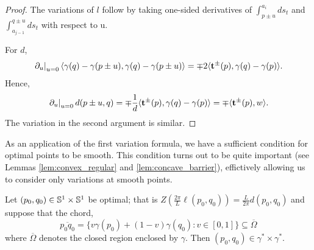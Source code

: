 \documentclass[12pt]{amsart}
\begin{document}
\begin{proof}
The variations of \(l\) follow by taking one-sided derivatives of \(\int_{p\pm u}^{a_i} ds_t\) and \(\int_{a_{j-1}}^{q \pm u} ds_t\) with respect to u.

For \(d\),
\[
\left.\partial_u\right|_{u=0} \langle{\gamma(q) - \gamma(p \pm u)},{\gamma(q) - \gamma(p \pm u)}\rangle = \mp 2 \langle{\operatorname{\mathbf{t}}^{\pm}(p)},{\gamma(q) - \gamma(p)}\rangle.
\]
Hence,
\[
\left.\partial_u\right|_{u=0} d (p \pm u, q) =  \mp \frac{1}{d} \langle{\operatorname{\mathbf{t}}^{\pm}(p)},{\gamma(q) - \gamma(p)}\rangle = \mp \langle{\operatorname{\mathbf{t}}^{\pm}(p)},{w}\rangle.
\]
The variation in the second argument is similar.
\end{proof}

As an application of the first variation formula, we have a sufficient condition for optimal points to be smooth. This condition turns out to be quite important (see Lemmas \ref{lem:convex_regular} and \ref{lem:concave_barrier}), effictively allowing us to consider only variations at smooth points.

\begin{lemma}
\label{lem:optimum_are_regular}

Let \((p_0,q_0) \in \mathbb{S}^1 \times \mathbb{S}^1\) be optimal; that is \(Z(\tfrac{2\pi}{L}\ell(p_0,q_0)) = \tfrac{L}{2\pi} d(p_0, q_0)\) and suppose that the chord,
\[
\overline{p_0 q_0} = \{v \gamma(p_0) + (1-v) \gamma(q_0) : v \in [0, 1]\} \subseteq \overline{\Omega}
\]
where \(\overline{\Omega}\) denotes the closed region enclosed by \(\gamma\). Then \((p_0, q_0) \in \gamma^{\ast} \times \gamma^{\ast}\).
\end{lemma}
\end{document}
